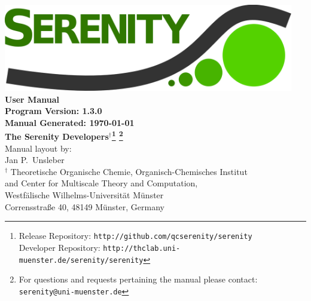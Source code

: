 \documentclass[bibliography=totocnumbered,a4paper,10pt,oneside]{scrbook}
\begin{document}
\thispagestyle{empty}
\begin{center}
\vspace*{1cm}
\includegraphics[width=0.95\textwidth]{./figs/SerenityLogo.png}\\
\vspace{2cm}
{\LARGE\textbf{
User Manual
}}\\
\vspace{1cm}
{\large\textbf{
Program Version: 1.3.0\\
Manual Generated: \today
}}\\
\vspace{2cm}
{\large\textbf{
The Serenity Developers$^{\dagger}$\footnote{Release Repository: \texttt{http://github.com/qcserenity/serenity}\\
                                             Developer Repository: \texttt{http://thclab.uni-muenster.de/serenity/serenity}}
\footnote{For questions and requests pertaining the manual please contact:\\ \texttt{serenity@uni-muenster.de}}
}}\\
\vspace{2cm}
{\large Manual layout by: \\
Jan P.\ Unsleber
}
\\[2ex]

$^{\dagger}$ Theoretische Organische Chemie,
Organisch-Chemisches Institut \\
and Center for Multiscale Theory and Computation,\\
Westf\"alische Wilhelms-Universit\"at M\"unster\\
Corrensstra{\ss}e 40, 48149 M\"unster, Germany\\[2ex]

\vfill
\end{center}
\newpage
{}
\setcounter{page}{1}
\tableofcontents

\newpage
{}
\setcounter{page}{1}
\end{document}
